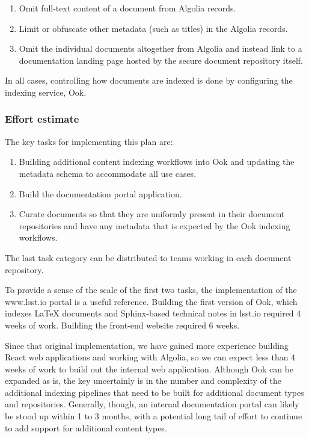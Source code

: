 \begin{enumerate}
  \item Omit full-text content of a document from Algolia records.
  \item Limit or obfuscate other metadata (such as titles) in the Algolia records.
  \item Omit the individual documents altogether from Algolia and instead link to a documentation landing page hosted by the secure document repository itself.
\end{enumerate}

In all cases, controlling how documents are indexed is done by configuring the indexing service, Ook.

\subsubsection{Effort estimate}

The key tasks for implementing this plan are:

\begin{enumerate}
  \item Building additional content indexing workflows into Ook and updating the metadata schema to accommodate all use cases.
  \item Build the documentation portal application.
  \item Curate documents so that they are uniformly present in their document repositories and have any metadata that is expected by the Ook indexing workflows.
\end{enumerate}

The last task category can be distributed to teams working in each document repository.

To provide a sense of the scale of the first two tasks, the implementation of the www.lsst.io portal is a useful reference. Building the first version of Ook, which indexes LaTeX documents and Sphinx-based technical notes in lsst.io required 4 weeks of work. Building the front-end website required 6 weeks.

Since that original implementation, we have gained more experience building React web applications and working with Algolia, so we can expect less than 4 weeks of work to build out the internal web application. Although Ook can be expanded as is, the key uncertainly is in the number and complexity of the additional indexing pipelines that need to be built for additional document types and repositories. Generally, though, an internal documentation portal can likely be stood up within 1 to 3 months, with a potential long tail of effort to continue to add support for additional content types.
